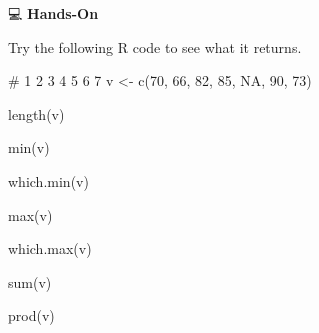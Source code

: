 \documentclass[
  letterpaper,
  DIV=11,
  numbers=noendperiod]{scrreprt}
\newenvironment{Shaded}{\begin{snugshade}}{\end{snugshade}}
\newcommand{\CommentTok}[1]{\textcolor[rgb]{0.37,0.37,0.37}{#1}}
\newcommand{\ConstantTok}[1]{\textcolor[rgb]{0.56,0.35,0.01}{#1}}
\newcommand{\DecValTok}[1]{\textcolor[rgb]{0.68,0.00,0.00}{#1}}
\newcommand{\FunctionTok}[1]{\textcolor[rgb]{0.28,0.35,0.67}{#1}}
\newcommand{\NormalTok}[1]{\textcolor[rgb]{0.00,0.23,0.31}{#1}}
\newcommand{\OtherTok}[1]{\textcolor[rgb]{0.00,0.23,0.31}{#1}}
\begin{document}
💻 \textbf{Hands-On}

Try the following R code to see what it returns.

\begin{Shaded}
\begin{Highlighting}[]
\CommentTok{\#       1   2   3   4   5   6   7}
\NormalTok{v }\OtherTok{\textless{}{-}} \FunctionTok{c}\NormalTok{(}\DecValTok{70}\NormalTok{, }\DecValTok{66}\NormalTok{, }\DecValTok{82}\NormalTok{, }\DecValTok{85}\NormalTok{, }\ConstantTok{NA}\NormalTok{, }\DecValTok{90}\NormalTok{, }\DecValTok{73}\NormalTok{)}

\FunctionTok{length}\NormalTok{(v)}

\FunctionTok{min}\NormalTok{(v)}

\FunctionTok{which.min}\NormalTok{(v)}

\FunctionTok{max}\NormalTok{(v)}

\FunctionTok{which.max}\NormalTok{(v)}

\FunctionTok{sum}\NormalTok{(v)}

\FunctionTok{prod}\NormalTok{(v)}
\end{Highlighting}
\end{Shaded}
\end{document}
